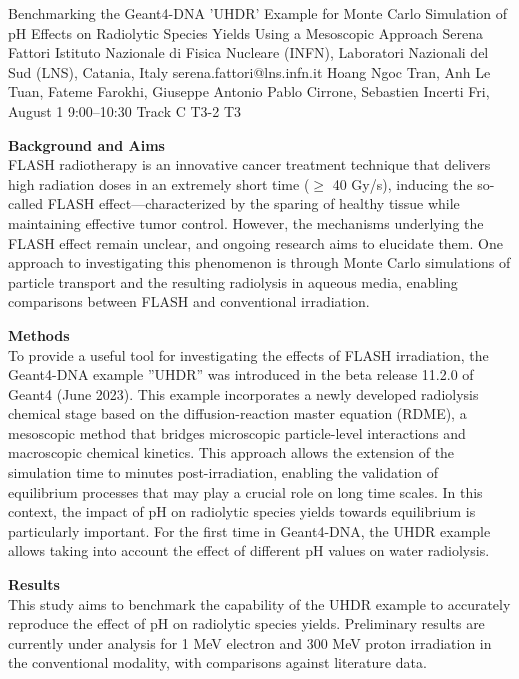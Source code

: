 \begin{talk}
  {Benchmarking the Geant4-DNA 'UHDR' Example for Monte Carlo Simulation of pH Effects on Radiolytic Species Yields Using a Mesoscopic Approach}%
  {Serena Fattori}%
  {Istituto Nazionale di Fisica Nucleare (INFN), Laboratori Nazionali del Sud (LNS), Catania, Italy}%
  {serena.fattori@lns.infn.it}%
  {Hoang Ngoc Tran, Anh Le Tuan, Fateme Farokhi, Giuseppe Antonio Pablo Cirrone, Sebastien Incerti}%
  {}%
  {Fri, August 1 9:00–10:30 Track C}%
  {T3-2}%
  {T3}%
  
				
			
\textbf{Background and Aims}\\
FLASH radiotherapy is an innovative cancer treatment technique that delivers high radiation doses in an extremely short time ($\geq$ 40 Gy/s), inducing the so-called FLASH effect—characterized by the sparing of healthy tissue while maintaining effective tumor control. However, the mechanisms underlying the FLASH effect remain unclear, and ongoing research aims to elucidate them. One approach to investigating this phenomenon is through Monte Carlo simulations of particle transport and the resulting radiolysis in aqueous media, enabling comparisons between FLASH and conventional irradiation.

\textbf{Methods}\\
To provide a useful tool for investigating the effects of FLASH irradiation, the Geant4-DNA example ''UHDR'' was introduced in the beta release 11.2.0 of Geant4 (June 2023). This example incorporates a newly developed radiolysis chemical stage based on the diffusion-reaction master equation (RDME), a mesoscopic method that bridges microscopic particle-level interactions and macroscopic chemical kinetics. This approach allows the extension of the simulation time to minutes post-irradiation, enabling the validation of equilibrium processes that may play a crucial role on long time scales. In this context, the impact of pH on radiolytic species yields towards equilibrium is particularly important. For the first time in Geant4-DNA, the UHDR example allows taking into account the effect of different pH values on water radiolysis.

\textbf{Results}\\
This study aims to benchmark the capability of the UHDR example to accurately reproduce the effect of pH on radiolytic species yields. Preliminary results are currently under analysis for 1 MeV electron and 300 MeV proton irradiation in the conventional modality, with comparisons against literature data.


\end{talk}
